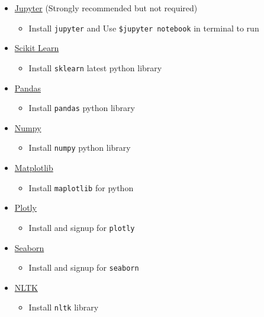 \documentclass[11pt]{article}
\providecommand{\tightlist}{%
      \setlength{\itemsep}{0pt}\setlength{\parskip}{0pt}}
\begin{document}
\begin{itemize}
\tightlist
\item
  \href{http://jupyter.org/}{Jupyter} (Strongly recommended but not
  required)

  \begin{itemize}
  \tightlist
  \item
    Install \texttt{jupyter} and Use \texttt{\$jupyter\ notebook} in
    terminal to run
  \end{itemize}
\item
  \href{http://scikit-learn.org/stable/index.html}{Scikit Learn}

  \begin{itemize}
  \tightlist
  \item
    Install \texttt{sklearn} latest python library
  \end{itemize}
\item
  \href{http://pandas.pydata.org/}{Pandas}

  \begin{itemize}
  \tightlist
  \item
    Install \texttt{pandas} python library
  \end{itemize}
\item
  \href{http://www.numpy.org/}{Numpy}

  \begin{itemize}
  \tightlist
  \item
    Install \texttt{numpy} python library
  \end{itemize}
\item
  \href{https://matplotlib.org/}{Matplotlib}

  \begin{itemize}
  \tightlist
  \item
    Install \texttt{maplotlib} for python
  \end{itemize}
\item
  \href{https://plot.ly/}{Plotly}

  \begin{itemize}
  \tightlist
  \item
    Install and signup for \texttt{plotly}
  \end{itemize}
\item
  \href{https://seaborn.pydata.org/}{Seaborn}

  \begin{itemize}
  \tightlist
  \item
    Install and signup for \texttt{seaborn}
  \end{itemize}
\item
  \href{http://www.nltk.org/}{NLTK}

  \begin{itemize}
  \tightlist
  \item
    Install \texttt{nltk} library
  \end{itemize}
\end{itemize}
\end{document}
